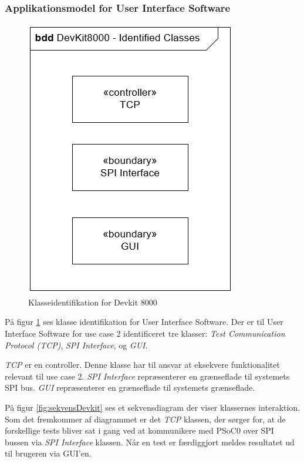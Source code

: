 \subsubsection{Applikationsmodel for User Interface Software}

\begin{figure}[H]
	\centering
	\includegraphics[scale=0.8]{Systemarkitektur/images/KlasseIdentifikationDevKit.png}
	\caption{Klasseidentifikation for Devkit 8000}
	\label{fig:klasseidentifikationDevKit}
\end{figure}

På figur \ref{fig:klasseidentifikationDevKit} ses klasse identifikation for User Interface Software. Der er til User Interface Software for use case 2 identificeret tre klasser: \textit{Test Communication Protocol (TCP)}, \textit{SPI Interface}, og \textit{GUI}.

\textit{TCP} er en controller. Denne klasse har til ansvar at eksekvere funktionalitet relevant til use case 2. \textit{SPI Interface} repræsenterer en grænseflade til systemets SPI bus. \textit{GUI} repræsenterer en grænseflade til systemets grænseflade.

På figur \ref{fig:sekvensDevkit} ses et sekvensdiagram der viser klassernes interaktion. Som det fremkommer af diagrammet er det \textit{TCP} klassen, der sørger for, at de forskellige tests bliver sat i gang ved at kommunikere med PSoC0 over SPI bussen via \textit{SPI Interface} klassen. Når en test er færdiggjort meldes resultatet ud til brugeren via GUI'en.

